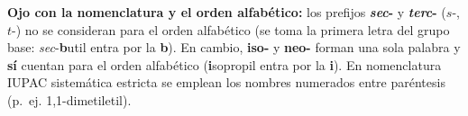 \documentclass[12pt, letterpaper]{article}
\begin{document}
\vspace{0.4em}

\begin{cuadroadvertencia}
\textbf{Ojo con la nomenclatura y el orden alfabético:}
los prefijos \textbf{\emph{sec}-} y \textbf{\emph{terc}-} ($s$-, $t$-) no se consideran para el orden alfabético (se toma la primera letra del grupo base: \emph{sec}-\textbf{b}util entra por la \textbf{b}). En cambio, \textbf{iso-} y \textbf{neo-} forman una sola palabra y \textbf{sí} cuentan para el orden alfabético (\textbf{i}sopropil entra por la \textbf{i}). En nomenclatura IUPAC sistemática estricta se emplean los nombres numerados entre paréntesis (p.~ej. 1,1-dimetiletil).
\end{cuadroadvertencia}
\end{document}
